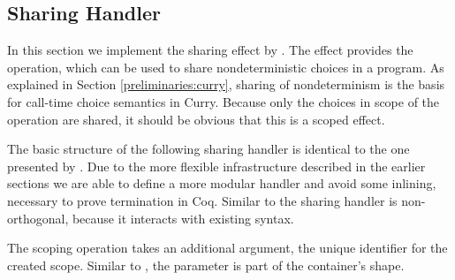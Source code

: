 \subsection{Sharing Handler}

In this section we implement the sharing effect by
\textcite{bunkenburg2019modeling}.
The effect provides the  operation, which can be used to
share nondeterministic choices in a program.
As explained in Section \ref{preliminaries:curry}, sharing of nondeterminism is
the basis for call-time choice semantics in Curry.
Because only the choices in scope of the  operation are
shared, it should be obvious that this is a scoped effect.

The basic structure of the following sharing handler is identical to the one
presented by \textcite{bunkenburg2019modeling}.
Due to the more flexible infrastructure described in the earlier sections we
are able to define a more modular handler and avoid some inlining, necessary to
prove termination in Coq.
Similar to  the sharing handler is non-orthogonal, because it
interacts with existing  syntax.

The scoping operation  takes an additional argument, the
unique identifier for the created scope.
Similar to , the parameter is part of the container's shape.

